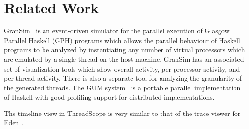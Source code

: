 \section{Related Work}

GranSim~\cite{loidl} is an event-driven simulator for the parallel
execution of Glasgow Parallel Haskell (GPH) programs which allows the
parallel behaviour of Haskell programs to be analyzed by instantiating
any number of virtual processors which are emulated by a single thread
on the host machine. GranSim has an associated set of visualization
tools which show overall activity, per-processor activity, and
per-thread activity. There is also a separate tool for analyzing the
granularity of the generated threads. The GUM
system~\cite{Trinder:gum} is a portable parallel implementation of
Haskell with good profiling support for distributed implementations.

The timeline view in ThreadScope is very similar to that of the trace
viewer for Eden \cite{eden}.
